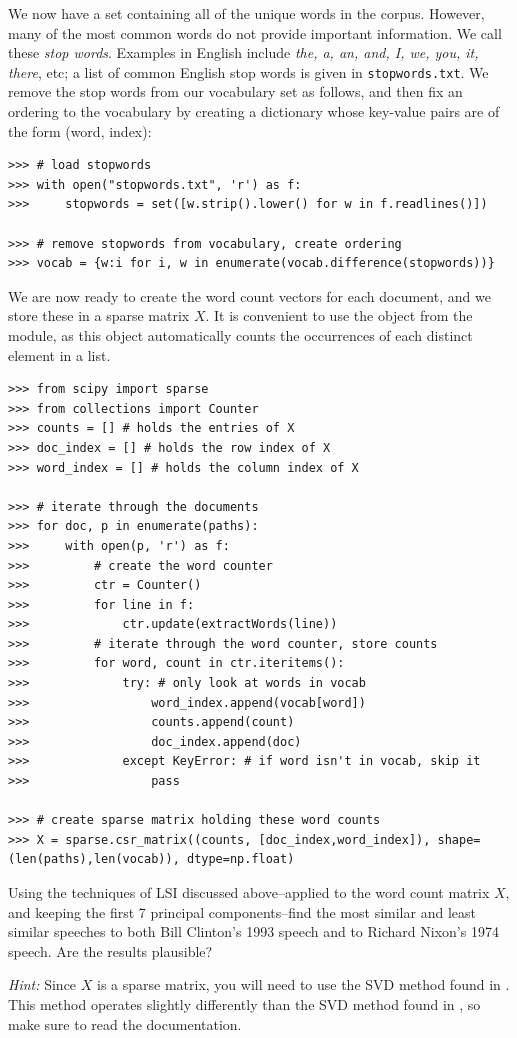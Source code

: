 We now have a set containing all of the unique words in the corpus. However, many of the most common words do not provide important information.
We call these \emph{stop words}. Examples in English include \emph{the, a, an, and, I, we, you, it, there}, etc;
a list of common English stop words is given in {\tt stopwords.txt}.
We remove the stop words from our vocabulary set as follows, and then fix an ordering to the vocabulary by creating a dictionary
whose key-value pairs are of the form (word, index):
\begin{lstlisting}
>>> # load stopwords
>>> with open("stopwords.txt", 'r') as f:
>>>     stopwords = set([w.strip().lower() for w in f.readlines()])

>>> # remove stopwords from vocabulary, create ordering
>>> vocab = {w:i for i, w in enumerate(vocab.difference(stopwords))}
\end{lstlisting}

We are now ready to create the word count vectors for each document, and we store these in a sparse matrix $X$.
It is convenient to use the  object from the  module, as this
object automatically counts the occurrences of each distinct element in a list.
\begin{lstlisting}
>>> from scipy import sparse
>>> from collections import Counter
>>> counts = [] # holds the entries of X
>>> doc_index = [] # holds the row index of X
>>> word_index = [] # holds the column index of X

>>> # iterate through the documents
>>> for doc, p in enumerate(paths):
>>>     with open(p, 'r') as f:
>>>         # create the word counter
>>>         ctr = Counter()
>>>         for line in f:
>>>             ctr.update(extractWords(line))
>>>         # iterate through the word counter, store counts
>>>         for word, count in ctr.iteritems():
>>>             try: # only look at words in vocab
>>>                 word_index.append(vocab[word])
>>>                 counts.append(count)
>>>                 doc_index.append(doc)
>>>             except KeyError: # if word isn't in vocab, skip it
>>>                 pass

>>> # create sparse matrix holding these word counts
>>> X = sparse.csr_matrix((counts, [doc_index,word_index]), shape=(len(paths),len(vocab)), dtype=np.float)
\end{lstlisting}

\begin{problem}
Using the techniques of LSI discussed above--applied to the word count matrix $X$, and keeping the first 7 principal components--find the most similar and least similar speeches to both Bill Clinton's 1993 speech and to Richard Nixon's 1974 speech.
Are the results plausible?

\emph{Hint:} Since $X$ is a sparse matrix, you will need to use the SVD method found in .
This method operates slightly differently than the SVD method found in , so make sure to read the
documentation.
\label{prob:LSI1}
\end{problem}

